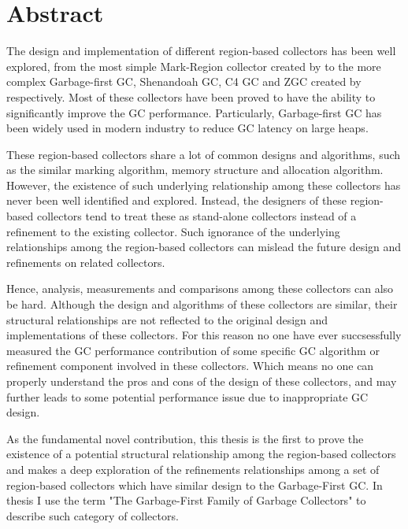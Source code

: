 \chapter*{Abstract}
\vspace{-1em}


The design and implementation of different region-based collectors has been well explored, from the
most simple Mark-Region collector created by \cite{sergeant2014improving} to the
more complex Garbage-first GC, Shenandoah GC, C4 GC and ZGC created by
\citep{detlefs2004garbage,flood2016shenandoah,tene2011c4,liden_karlsson_2018} respectively.
Most of these collectors have been proved to have the ability to
significantly improve the GC performance.
Particularly, Garbage-first GC has been widely used in modern industry to reduce
GC latency on large heaps.

These region-based collectors share a lot of common designs and algorithms, such as
the similar marking algorithm, memory structure and allocation algorithm.
However, the existence of such underlying relationship among these collectors
has never been well identified and explored.
Instead, the designers of these region-based collectors tend to treat these as
stand-alone collectors instead of a refinement to the existing collector.
Such ignorance of the underlying relationships among the region-based collectors
can mislead the future design and refinements on related collectors. 

Hence, analysis, measurements and comparisons among these collectors can also be hard.
Although the design and algorithms of these collectors are similar,
their structural relationships are not reflected to the
original design and implementations of these collectors.
For this reason no one have ever succsessfully measured
the GC performance contribution of some specific GC algorithm or refinement component involved
in these collectors.
Which means no one can properly understand the pros and cons
of the design of these collectors, and may further leads to some potential performance
issue due to inappropriate GC design.


As the fundamental novel contribution, this thesis is the first to prove the existence of a potential
structural relationship among the region-based collectors and makes a deep exploration
of the refinements relationships among a set of region-based collectors which have similar
design to the Garbage-First GC. In thesis I use the term
"The Garbage-First Family of Garbage Collectors" to describe such category of collectors.


